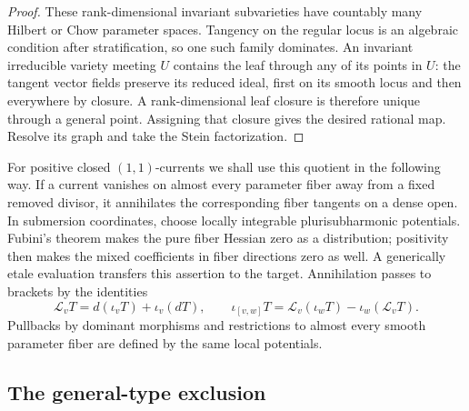 \begin{proof}
These rank-dimensional invariant subvarieties have countably many
Hilbert or Chow parameter spaces. Tangency on the regular locus is
an algebraic condition after stratification, so one such family
dominates. An invariant irreducible variety meeting \(U\) contains
the leaf through any of its points in \(U\): the tangent vector
fields preserve its reduced ideal, first on its smooth locus and
then everywhere by closure. A rank-dimensional leaf closure is
therefore unique through a general point. Assigning that closure
gives the desired rational map. Resolve its graph and take the
Stein factorization.
\end{proof}

For positive closed \((1,1)\)-currents we shall use this quotient in
the following way. If a current vanishes on almost every parameter
fiber away from a fixed removed divisor, it annihilates the
corresponding fiber tangents on a dense open. In submersion
coordinates, choose locally integrable plurisubharmonic potentials.
Fubini's theorem makes the pure fiber Hessian zero as a
distribution; positivity then makes the mixed coefficients in
fiber directions zero as well. A generically etale evaluation
transfers this assertion to the target. Annihilation passes to
brackets by the identities
\[
 \mathcal L_v T=d(\iota_vT)+\iota_v(dT),\qquad
 \iota_{[v,w]}T=\mathcal L_v(\iota_wT)-\iota_w(\mathcal L_vT).
\]
Pullbacks by dominant morphisms and restrictions to almost every
smooth parameter fiber are defined by the same local potentials.

\subsection{The general-type exclusion}

